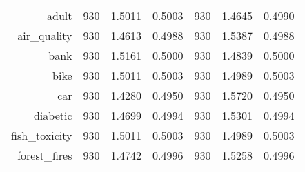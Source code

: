 \begin{table}[htbp]
{\begin{tabular}{rcccccc}
                  adult                              & 930                                & 1.5011                                                                             & 0.5003          & 930                               & \cellcolor[rgb]{ .776,  .937,  .808}\textcolor[rgb]{ 0,  .38,  0}{1.4645} & 0.4990          \\
                  air\_quality                       & 930                                & \cellcolor[rgb]{ .776,  .937,  .808}\textcolor[rgb]{ 0,  .38,  0}{1.4613}          & 0.4988          & 930                               & 1.5387                                                                    & 0.4988          \\
                  bank                               & 930                                & 1.5161                                                                             & 0.5000          & 930                               & \cellcolor[rgb]{ .776,  .937,  .808}\textcolor[rgb]{ 0,  .38,  0}{1.4839} & 0.5000          \\
                  bike                               & 930                                & 1.5011                                                                             & 0.5003          & 930                               & \cellcolor[rgb]{ .776,  .937,  .808}\textcolor[rgb]{ 0,  .38,  0}{1.4989} & 0.5003          \\
                  car                                & 930                                & \cellcolor[rgb]{ .776,  .937,  .808}\textcolor[rgb]{ 0,  .38,  0}{1.4280}          & 0.4950          & 930                               & 1.5720                                                                    & 0.4950          \\
                  diabetic                           & 930                                & \cellcolor[rgb]{ .776,  .937,  .808}\textcolor[rgb]{ 0,  .38,  0}{1.4699}          & 0.4994          & 930                               & 1.5301                                                                    & 0.4994          \\
                  fish\_toxicity                     & 930                                & 1.5011                                                                             & 0.5003          & 930                               & \cellcolor[rgb]{ .776,  .937,  .808}\textcolor[rgb]{ 0,  .38,  0}{1.4989} & 0.5003          \\
                  forest\_fires                      & 930                                & \cellcolor[rgb]{ .776,  .937,  .808}\textcolor[rgb]{ 0,  .38,  0}{1.4742}          & 0.4996          & 930                               & 1.5258                                                                    & 0.4996          \\

\end{tabular}}
\end{table}
